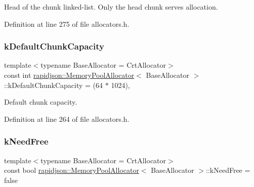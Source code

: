 Head of the chunk linked-\/list. Only the head chunk serves allocation. 



Definition at line 275 of file allocators.\+h.

\mbox{\label{classrapidjson_1_1_memory_pool_allocator_aeee1e169678a23611887feded99007a2}} 
\subsubsection{\texorpdfstring{kDefaultChunkCapacity}{kDefaultChunkCapacity}}
{\footnotesize\ttfamily template$<$typename Base\+Allocator = Crt\+Allocator$>$ \\
const int \mbox{\hyperlink{classrapidjson_1_1_memory_pool_allocator}{rapidjson\+::\+Memory\+Pool\+Allocator}}$<$ Base\+Allocator $>$\+::k\+Default\+Chunk\+Capacity = (64 $\ast$ 1024)\hspace{0.3cm}{\ttfamily [static]}, {\ttfamily [private]}}



Default chunk capacity. 



Definition at line 264 of file allocators.\+h.

\mbox{\label{classrapidjson_1_1_memory_pool_allocator_a2606d96e19bcfc9d4bf58aefe55c1b29}} 
\subsubsection{\texorpdfstring{kNeedFree}{kNeedFree}}
{\footnotesize\ttfamily template$<$typename Base\+Allocator = Crt\+Allocator$>$ \\
const bool \mbox{\hyperlink{classrapidjson_1_1_memory_pool_allocator}{rapidjson\+::\+Memory\+Pool\+Allocator}}$<$ Base\+Allocator $>$\+::k\+Need\+Free = false\hspace{0.3cm}{\ttfamily [static]}}



